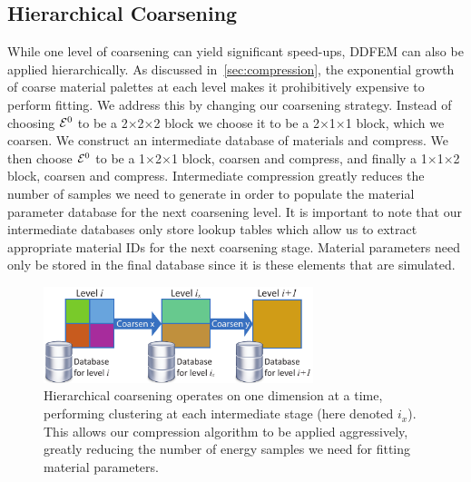 \subsection{Hierarchical Coarsening}
While one level of coarsening can yield significant speed-ups, DDFEM can also be applied hierarchically.
As discussed in~\autoref{sec:compression}, the exponential growth of coarse material palettes at each level makes it prohibitively expensive to perform fitting.
We address this by changing our coarsening strategy. 
Instead of choosing $\mathcal{E}^0$ to be a 2$\times$2$\times$2 block we choose it to be a 2$\times$1$\times$1 block, which we coarsen. We construct an intermediate database of materials and compress. 
We then choose $\mathcal{E}^0$ to be a 1$\times$2$\times$1 block, coarsen and compress, and finally a 1$\times$1$\times$2 block, coarsen and compress. Intermediate compression greatly reduces the number of samples we need to generate in order to populate the material parameter database for the next coarsening level. 
It is important to note that our intermediate databases only store lookup tables which allow us to extract appropriate material IDs for the next coarsening stage. Material parameters need only be stored in the final database since it is these elements that are simulated.
\begin{figure}
	\centering
	\includegraphics[width=0.7\textwidth]{images/hierchical}
	\caption{Hierarchical coarsening operates on one dimension at a time, performing clustering at each intermediate stage (here denoted $i_x$). This allows our compression algorithm to be applied aggressively, greatly reducing the number of energy samples we need for fitting material parameters. }
	\label{fig:hierarchy}
\end{figure}
